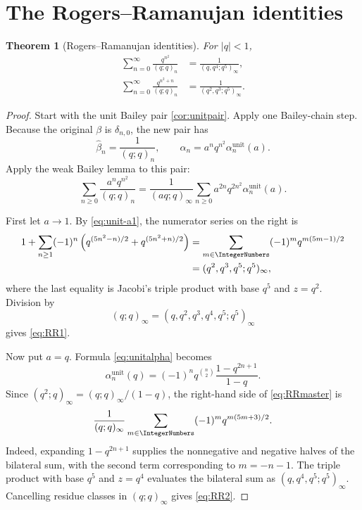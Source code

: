 \documentclass[11pt]{article}
\numberwithin{equation}{section}
\newtheorem{theorem}{Theorem}[section]
\theoremstyle{definition}
\theoremstyle{remark}
\newcommand{\BaileyTransformedAlpha}{\widehat{\alpha}}
\newcommand{\BaileyTransformedBeta}{\widehat{\beta}}
\begin{document}
\section{The Rogers--Ramanujan identities}

\begin{theorem}[Rogers--Ramanujan identities]\label{thm:RR}
For $|q|<1$,
\begin{align}
\sum_{n=0}^{\infty}\frac{q^{n^2}}{(q;q)_n}
&=\frac1{(q,q^4;q^5)_\infty},\label{eq:RR1}\\
\sum_{n=0}^{\infty}\frac{q^{n^2+n}}{(q;q)_n}
&=\frac1{(q^2,q^3;q^5)_\infty}.\label{eq:RR2}
\end{align}
\end{theorem}
\begin{proof}
Start with the unit Bailey pair \cref{cor:unitpair}.  Apply one Bailey-chain
step.  Because the original $\beta$ is $\delta_{n,0}$, the new pair has
\[
\BaileyTransformedBeta_n=\frac1{(q;q)_n},\qquad
\BaileyTransformedAlpha_n=a^nq^{n^2}\alpha_n^{\mathrm{unit}}(a).
\]
Apply the weak Bailey lemma to this pair:
\begin{equation}\label{eq:RRmaster}
\sum_{n\ge0}\frac{a^nq^{n^2}}{(q;q)_n}
=\frac1{(aq;q)_\infty}
\sum_{n\ge0}a^{2n}q^{2n^2}\alpha_n^{\mathrm{unit}}(a).
\end{equation}

First let $a\to1$.  By \eqref{eq:unit-a1}, the numerator series on the right
is
\begin{align*}
1+\sum_{n\ge1}(-1)^n
\left(q^{(5n^2-n)/2}+q^{(5n^2+n)/2}\right)
&=\sum_{m\in\IntegerNumbers}(-1)^mq^{m(5m-1)/2}\\
&=(q^2,q^3,q^5;q^5)_\infty,
\end{align*}
where the last equality is Jacobi's triple product with base $q^5$ and
$z=q^2$.  Division by
\[
(q;q)_\infty=(q,q^2,q^3,q^4,q^5;q^5)_\infty
\]
gives \eqref{eq:RR1}.

Now put $a=q$.  Formula \eqref{eq:unitalpha} becomes
\[
\alpha_n^{\mathrm{unit}}(q)
=(-1)^nq^{\binom n2}\frac{1-q^{2n+1}}{1-q}.
\]
Since $(q^2;q)_\infty=(q;q)_\infty/(1-q)$, the right-hand side of
\eqref{eq:RRmaster} is
\[
\frac1{(q;q)_\infty}
\sum_{m\in\IntegerNumbers}(-1)^mq^{m(5m+3)/2}.
\]
Indeed, expanding $1-q^{2n+1}$ supplies the nonnegative and negative halves
of the bilateral sum, with the second term corresponding to $m=-n-1$.
The triple product with base $q^5$ and $z=q^4$ evaluates the bilateral sum as
$(q,q^4,q^5;q^5)_\infty$.  Cancelling residue classes in $(q;q)_\infty$
gives \eqref{eq:RR2}.
\end{proof}
\end{document}
